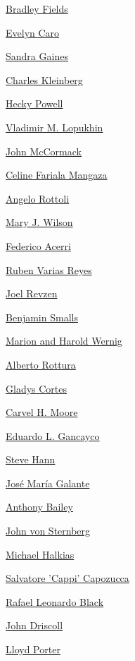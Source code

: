 \protect\hyperlink{bradley-fields}{Bradley Fields}

\protect\hyperlink{evelyn-caro}{Evelyn Caro}

\protect\hyperlink{sandra-gaines}{Sandra Gaines}

\protect\hyperlink{charles-kleinberg}{Charles Kleinberg}

\protect\hyperlink{hecky-powell}{Hecky Powell}

\protect\hyperlink{vladimir-m-lopukhin}{Vladimir M. Lopukhin}

\protect\hyperlink{john-mccormack}{John McCormack}

\protect\hyperlink{celine-fariala-mangaza}{Celine Fariala Mangaza}

\protect\hyperlink{angelo-rottoli}{Angelo Rottoli}

\protect\hyperlink{mary-j-wilson}{Mary J. Wilson}

\protect\hyperlink{federico-acerri}{Federico Acerri}

\protect\hyperlink{ruben-varias-reyes}{Ruben Varias Reyes}

\protect\hyperlink{joel-revzen}{Joel Revzen}

\protect\hyperlink{benjamin-smalls}{Benjamin Smalls}

\protect\hyperlink{marion-and-harold-wernig}{Marion and Harold Wernig}

\protect\hyperlink{alberto-rottura}{Alberto Rottura}

\protect\hyperlink{gladys-cortes}{Gladys Cortes}

\protect\hyperlink{carvel-h-moore}{Carvel H. Moore}

\protect\hyperlink{eduardo-l-gancayco}{Eduardo L. Gancayco}

\protect\hyperlink{steve-hann}{Steve Hann}

\protect\hyperlink{josuxe9-maruxeda-galante}{José María Galante}

\protect\hyperlink{anthony-bailey}{Anthony Bailey}

\protect\hyperlink{john-von-sternberg}{John von Sternberg}

\protect\hyperlink{michael-halkias}{Michael Halkias}

\protect\hyperlink{salvatore-cappi-capozucca}{Salvatore 'Cappi'
Capozucca}

\protect\hyperlink{rafael-leonardo-black}{Rafael Leonardo Black}

\protect\hyperlink{john-driscoll}{John Driscoll}

\protect\hyperlink{lloyd-porter}{Lloyd Porter}


